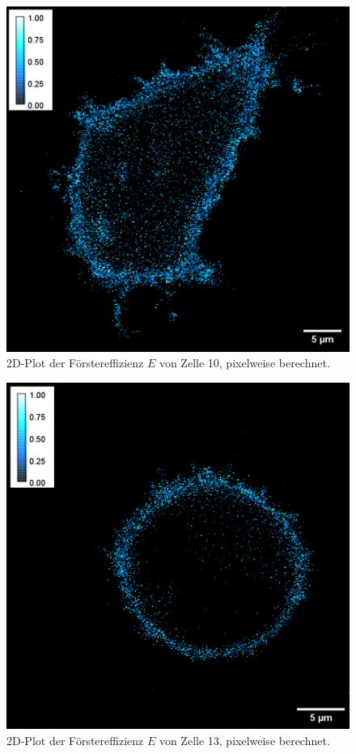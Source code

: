 \begin{figure}[h]
    \centering
    \includegraphics[scale = 0.45]{Bilder/E10.png}
    \caption{2D-Plot der Förstereffizienz $E$ von Zelle 10, pixelweise berechnet.}
    \label{bild:E10}
\end{figure}

\begin{figure}[h]
    \centering
    \includegraphics[scale = 0.45]{Bilder/E13.png}
    \caption{2D-Plot der Förstereffizienz $E$ von Zelle 13, pixelweise berechnet.}
    \label{bild:E13}
\end{figure}

